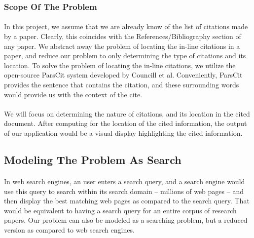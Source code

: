 \documentclass[12 pt]{article}
\begin{document}
\subsubsection{Scope Of The Problem}
\paragraph{}
In this project, we assume that we are already know of the list of citations made by a paper. Clearly, this coincides with the References/Bibliography section of any paper. We abstract away the problem of locating the in-line citations in a paper, and reduce our problem to only determining the type of citations and its location. To solve the problem of locating the in-line citations, we utilize the open-source ParsCit\cite{parscit} system developed by Councill et al. Conveniently, ParsCit provides the sentence that contains the citation, and these surrounding words would provide us with the context of the cite.

\paragraph{}
We will focus on determining the nature of citations, and its location in the cited document. After computing for the location of the cited information, the output of our application would be a visual display highlighting the cited information.

\subsection{Modeling The Problem As Search}
\paragraph{}
In web search engines, an user enters a search query, and a search engine would use this query to search within its search domain -- millions of web pages -- and then display the best matching web pages as compared to the search query. That would be equivalent to having a search query for an entire corpus of research papers. Our problem can also be modeled as a searching problem, but a reduced version as compared to web search engines.
\end{document}
